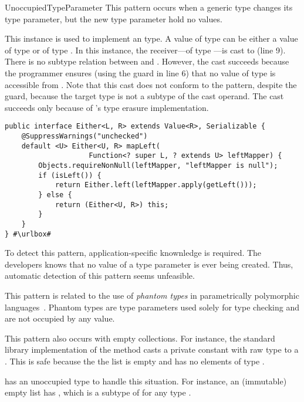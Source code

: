 \begin{pattern}{UnoccupiedTypeParameter}
This pattern occurs when a generic type changes its type parameter,
but the new type parameter hold no values.

\instances{}
This instance is used to implement an  type.
A value of type  can be either a value of type  or of type .
In this instance, the receiver---of type ---is cast to  (line 9).
There is no subtype relation between  and .
However, the cast succeeds because the programmer ensures
(using the guard  in line 6)
that no value of type  is accessible from .
Note that this cast does not conform to the 
pattern, despite the guard, because the target type is not a subtype of the
cast operand.
The cast succeeds only because of \java{}'s type erasure
implementation.

\def\urlvar{http://bit.ly/vavr_io_vavr_2SMIfI2}
\begin{verbatim}
public interface Either<L, R> extends Value<R>, Serializable {
    @SuppressWarnings("unchecked")
    default <U> Either<U, R> mapLeft(
                    Function<? super L, ? extends U> leftMapper) {
        Objects.requireNonNull(leftMapper, "leftMapper is null");
        if (isLeft()) {
            return Either.left(leftMapper.apply(getLeft()));
        } else {
            return (Either<U, R>) this;
        }
    }
} #\urlbox#
\end{verbatim}


\detection{}
To detect this pattern, application-specific knownledge is required.
The developers knows that no value of a type parameter is ever being created. 
Thus, automatic detection of this pattern seems unfeasible.

\issues{}
This pattern is related to the use of \emph{phantom types} in parametrically polymorphic languages~\citep{LeijenMeijer99,cheneyHinzePhantomTypes}.
Phantom types are type parameters used solely for type checking and are not occupied by any value.

This pattern also occurs with empty collections.
For instance, the \java{} standard library implementation of the method  casts a private constant with raw type  to a .
This is safe because the the list is empty and has no elements of type .

\scala{} has an unoccupied  type to handle this situation.
For instance, an (immutable) empty list has ,
which is a subtype of  for any type .

\end{pattern}